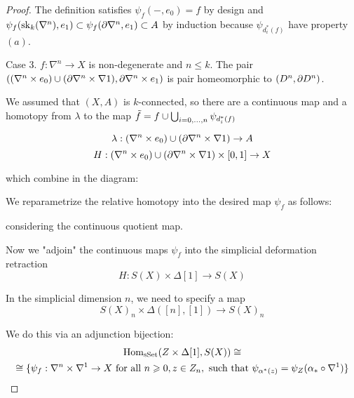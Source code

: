 \begin{proof}
The definition satisfies $\psi_f(-,e_0)=f$ by design and $\psi_f(\operatorname{sk}_k(\nabla^n),e_1)\subset\psi_f(\partial\nabla^n,e_1)\subset A$ by induction because $\psi_{d_i^*(f)}$ have property $(a)$.

Case 3. $f:\nabla^n\to X$ is non-degenerate and $n\leq k$. The pair $((\nabla^n\times e_0)\cup(\partial\nabla^n\times\nabla1), \partial\nabla^n\times e_1)$ is pair homeomorphic to $(D^n,\partial D^n)$.

We assumed that $(X,A)$ is $k$-connected, so there are a continuous map and a homotopy from $\lambda$ to the map $\tilde f=f\cup\bigcup_{i=0,\dots,n} \psi_{d_i^*(f)}$

\[\lambda:(\nabla^n\times e_0)\cup(\partial\nabla^n\times\nabla1)\to A\]
\[H:(\nabla^n\times e_0)\cup(\partial\nabla^n\times\nabla1)\times[0,1]\to X\]

which combine in the diagram:
\begin{center}
\end{center}

We reparametrize the relative homotopy into the desired map $\psi_f$ as follows:
\begin{center}
\end{center}
considering the continuous quotient map.

Now we "adjoin" the continuous maps $\psi_f$ into the simplicial deformation retraction
\[H:S(X)\times\Delta[1]\to S(X)\]

In the simplicial dimension $n$, we need to specify a map
\[S(X)_n\times\Delta([n],[1])\to S(X)_n\]

We do this via an adjunction bijection:
\begin{multline*}
    \operatorname{Hom}_{\mathrm{sSet}}(Z\times\Delta[1],S(X))\cong\\
    \cong\{\psi_f:\nabla^n\times\nabla^1\to X \text{ for all } n\geqslant0, z\in Z_n,\text{ such that } \psi_{\alpha^*(z)}=\psi_Z(\alpha_*\circ\nabla^1)\}
\end{multline*}


\end{proof}
